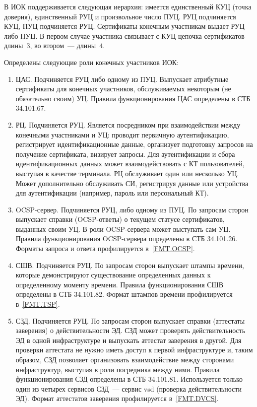 В ИОК поддерживается следующая иерархия: 
имеется единственный КУЦ (точка доверия), единственный РУЦ и
произвольное число ПУЦ. РУЦ подчиняется КУЦ, ПУЦ подчиняется РУЦ. 
Сертификаты конечным участникам выдает РУЦ либо ПУЦ.
%
В первом случае участника связывает с КУЦ цепочка сертификатов длины~$3$,
во втором~--- длины~$4$.

Определены следующие роли конечных участников ИОК:
\begin{enumerate}
\item
ЦАС. Подчиняется РУЦ либо одному из ПУЦ. 
Выпускает атрибутные сертификаты для 
конечных участников, обслуживаемых некоторым (не обязательно своим) УЦ.
Правила функционирования ЦАС определены в СТБ 34.101.67.

\item
РЦ. Подчиняется РУЦ.
Является посредником при взаимодействии между конечными участниками и УЦ:
проводит первичную аутентификацию, регистрирует идентификационные данные,
организует подготовку запросов на получение сертификата, визирует запросы. 
%
Для аутентификации и сбора идентификационных данных может 
взаимодействовать с КТ пользователей, выступая в качестве терминала. 
%  
РЦ обслуживает один или несколько УЦ. Может дополнительно 
обслуживать СИ, регистрируя данные или устройства для аутентификации 
(например, пароль или персональный КТ). 

\item
OCSP-сервер. Подчиняется РУЦ, либо одному из ПУЦ.
По запросам сторон выпускает справки (OCSP-ответы)
о текущем статусе сертификатов, выданных своим УЦ. 
В роли OCSP-сервера может выступать сам УЦ.
Правила функционирования OCSP-сервера определены в СТБ 34.101.26.
%
Форматы запроса и ответа профилируется в~\ref{FMT.OCSP}.

\item
СШВ. Подчиняется РУЦ.
По запросам сторон выпускает штампы времени, которые демонстрируют 
существование определенных данных к определенному моменту времени. 
Правила функционирования СШВ определены в СТБ 34.101.82.
%
Формат штампов времени профилируется в~\ref{FMT.TSP}.

\item
СЗД. Подчиняется РУЦ.
По запросам сторон выпускает справки (аттестаты заверения)
о действительности ЭД. 
%
СЗД может проверять действительность ЭД в одной инфраструктуре и 
выпускать аттестат заверения в другой. Для проверки аттестата не нужно 
иметь доступ к первой инфраструктуре и, таким образом, СЗД позволяет 
организовать взаимодействие между сторонами инфраструктур, выступая в роли 
посредника между ними. 
%
Правила функционирования СЗД определены в СТБ 34.101.81.
Используется только один из четырех сервисов СЗД~---
сервис vsd (проверка действительности ЭД).
%
Формат аттестатов заверения профилируется в~\ref{FMT.DVCS}.


\end{enumerate}
